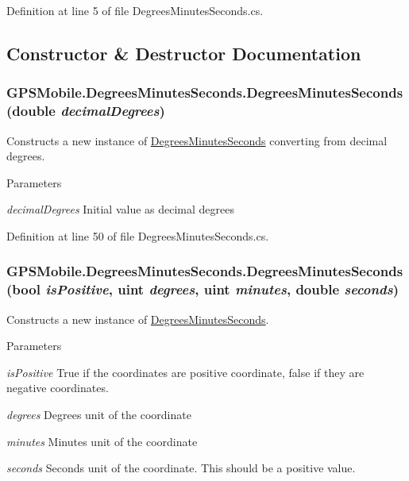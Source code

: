 Definition at line 5 of file DegreesMinutesSeconds.cs.

\subsection{Constructor \& Destructor Documentation}
\hypertarget{class_g_p_s_mobile_1_1_degrees_minutes_seconds_a5a0359c380dd9ab77197dde6b75a062c}{
\subsubsection[{DegreesMinutesSeconds}]{\setlength{\rightskip}{0pt plus 5cm}GPSMobile.DegreesMinutesSeconds.DegreesMinutesSeconds (double {\em decimalDegrees})}}
\label{class_g_p_s_mobile_1_1_degrees_minutes_seconds_a5a0359c380dd9ab77197dde6b75a062c}


Constructs a new instance of \hyperlink{class_g_p_s_mobile_1_1_degrees_minutes_seconds}{DegreesMinutesSeconds} converting from decimal degrees. 
\begin{DoxyParams}{Parameters}
\item[{\em decimalDegrees}]Initial value as decimal degrees\end{DoxyParams}


Definition at line 50 of file DegreesMinutesSeconds.cs.\hypertarget{class_g_p_s_mobile_1_1_degrees_minutes_seconds_a0beba9ff11f3b84a2604a3f78ef6da99}{
\subsubsection[{DegreesMinutesSeconds}]{\setlength{\rightskip}{0pt plus 5cm}GPSMobile.DegreesMinutesSeconds.DegreesMinutesSeconds (bool {\em isPositive}, \/  uint {\em degrees}, \/  uint {\em minutes}, \/  double {\em seconds})}}
\label{class_g_p_s_mobile_1_1_degrees_minutes_seconds_a0beba9ff11f3b84a2604a3f78ef6da99}


Constructs a new instance of \hyperlink{class_g_p_s_mobile_1_1_degrees_minutes_seconds}{DegreesMinutesSeconds}. 
\begin{DoxyParams}{Parameters}
\item[{\em isPositive}]True if the coordinates are positive coordinate, false if they are negative coordinates.\item[{\em degrees}]Degrees unit of the coordinate\item[{\em minutes}]Minutes unit of the coordinate\item[{\em seconds}]Seconds unit of the coordinate. This should be a positive value.\end{DoxyParams}


